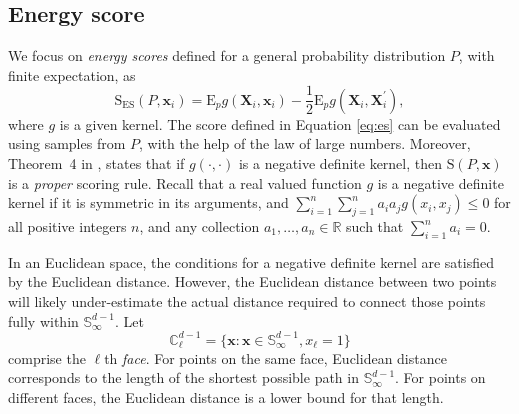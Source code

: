 \subsection{Energy score}
We focus on \emph{energy scores} defined for a general probability distribution $P$, with finite expectation, as 
    \begin{equation}
    \label{eq:es}
    \text{S}_{\text{ES}}\left(P, \bm{x}_i\right) =  \text{E}_p g\left(\bm{X}_i, \bm{x}_i\right) -
                                    \frac{1}{2}\text{E}_p g\left(\bm{X}_i,\bm{X}_i^{\prime}\right),
    \end{equation}
where $g$ is a given kernel. The score defined in Equation \eqref{eq:es} can be evaluated using samples from $P$, with the help of the law of large numbers.
Moreover, Theorem~4 in \cite{gneiting2007}, states that if $g(\cdot,\cdot)$ is a negative definite kernel, then $\text{S}(P,\bm{x})$ is a \emph{proper} scoring rule.  Recall that a real valued function $g$ is a negative definite kernel if it is symmetric in its arguments, and $\sum_{i=1}^n\sum_{j=1}^na_ia_jg(x_i,x_j)\leq 0$ for all positive integers $n$, and any collection $a_1,\ldots,a_n\in{\mathbb R}$ such that  $\sum_{i = 1}^na_i = 0$.  

In an Euclidean space, the conditions for a negative definite kernel are satisfied by the Euclidean distance. However, the Euclidean distance between two points will likely under-estimate the actual distance required to connect those points fully within ${\mathbb S}_{\infty}^{d-1}$.  Let
\begin{equation*}
    {\mathbb C}_{\ell}^{d-1} = \lbrace \bm{x} : \bm{x} \in {\mathbb S}_{\infty}^{d-1}, x_{\ell} = 1\rbrace
\end{equation*}
comprise the $\ell$th \emph{face}.  For points on the same face, Euclidean distance corresponds to the length of the shortest possible path in ${\mathbb S}_{\infty}^{d-1}$.  For points on different faces, the Euclidean distance is a lower bound for that length.

